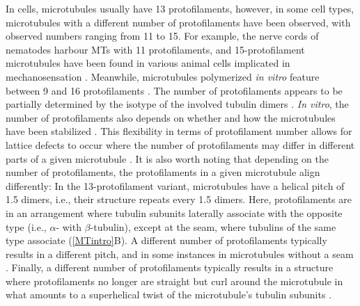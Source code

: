 In cells, microtubules usually have 13 protofilaments, however, in some cell types, microtubules with a different number of protofilaments have been observed, with observed numbers ranging from 11 to 15. For example, the nerve cords of nematodes harbour MTs with 11 protofilaments, and 15-protofilament microtubules have been found in various animal cells implicated in mechanosensation \parencite{Chaaban2017}. Meanwhile, microtubules polymerized \textit{in vitro} feature between 9 and 16 protofilaments \parencite{Chaaban2017}. The number of protofilaments appears to be partially determined by the isotype of the involved tubulin dimers \parencite{Ti2018}. \textit{In vitro}, the number of protofilaments also depends on whether and how the microtubules have been stabilized . This flexibility in terms of protofilament number allows for lattice defects to occur where the number of protofilaments may differ in different parts of a given microtubule . It is also worth noting that depending on the number of protofilaments, the protofilaments in a given microtubule align differently: In the 13-protofilament variant, microtubules have a helical pitch of 1.5 dimers, i.e., their structure repeats every 1.5 dimers. Here, protofilaments are in an arrangement where tubulin subunits laterally associate with the opposite type (i.e., $\alpha$- with $\beta$-tubulin), except at the seam, where tubulins of the same type associate (\autoref{MTintro}B). A different number of protofilaments typically results in a different pitch, and in some instances in microtubules without a seam . Finally, a different number of protofilaments typically results in a structure where protofilaments no longer are straight but curl around the microtubule in what amounts to a superhelical twist of the microtubule's tubulin subunits \parencite{Chaaban2017}.

